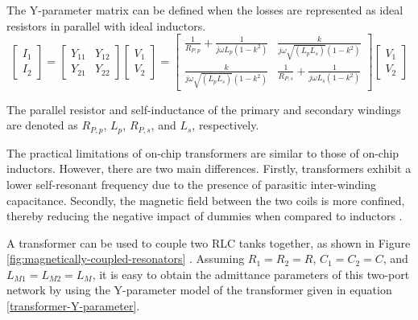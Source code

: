The Y-parameter matrix can be defined when the losses are represented as ideal resistors in parallel with ideal inductors.
\begin{equation}
\begin{bmatrix}
I_1 \\ I_2
\end{bmatrix} = 
\begin{bmatrix}
Y_{11} & Y_{12} \\
Y_{21} & Y_{22}
\end{bmatrix}
\begin{bmatrix}
V_1 \\ V_2
\end{bmatrix}=
\begin{bmatrix}
\frac{1}{R_{P,p}}+\frac{1}{j\omega L_p\left (1-k^2\right )} & \frac{k}{j\omega \sqrt{\left (L_p L_s\right )}\left (1-k^2\right)} \\
\frac{k}{j\omega \sqrt{\left (L_p L_s\right )}\left (1-k^2\right)} & \frac{1}{R_{P,s}}+\frac{1}{j\omega L_s\left (1-k^2\right )}
\end{bmatrix}
\begin{bmatrix}
V_1 \\ V_2
\end{bmatrix}
\label{transformer-Y-parameter}
\end{equation}

The parallel resistor and self-inductance of the primary and secondary windings are denoted as $R_{P,p}$, $L_p$, $R_{P,s}$, and $L_s$, respectively.

The practical limitations of on-chip transformers are similar to those of on-chip inductors. However, there are two main differences. Firstly, transformers exhibit a lower self-resonant frequency due to the presence of parasitic inter-winding capacitance. Secondly, the magnetic field between the two coils is more confined, thereby reducing the negative impact of dummies when compared to inductors \cite{6578194,6858393}.

A transformer can be used to couple two RLC tanks together, as shown in Figure \ref{fig:magnetically-coupled-resonators} \cite{7418056}. Assuming $R_1 = R_2 = R$, $C_1 = C_2 = C$, and $L_{M1} = L_{M2} = L_M$, it is easy to obtain the admittance parameters of this two-port network by using the Y-parameter model of the transformer given in equation \eqref{transformer-Y-parameter}.

